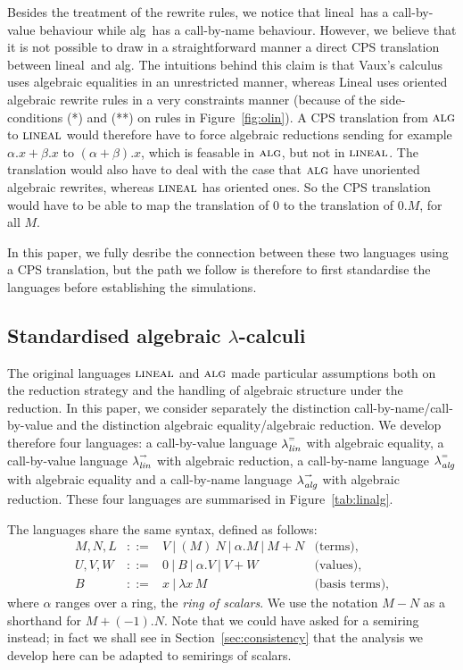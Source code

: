 \documentclass{LMCS}
\newcommand{\define}[1]{{\em #1}}
\newcommand{\olin}{\mbox{\sc lineal}}
\newcommand{\oalg}{\mbox{\sc alg}}
\newcommand{\xllin}[1]{\ensuremath{\lambda^{\raisebox{0.5ex}{\textrm{\tiny $#1$}}}_{{\it lin}}}}
\newcommand{\xlalg}[1]{\ensuremath{\lambda^{\raisebox{0.5ex}{\textrm{\tiny $#1$}}}_{{\it alg}}}}
\newcommand{\llinred}{\xllin{\rightarrow}}
\newcommand{\lalgred}{\xlalg{\rightarrow}}
\newcommand{\llineq}{\xllin{=}}
\newcommand{\lalgeq}{\xlalg{=}}
\begin{document}
Besides the treatment of the rewrite rules, we notice
that \olin\ has a call-by-value behaviour while \oalg\ has a
call-by-name behaviour. However, we believe that it is not possible to
draw in a straightforward manner a direct CPS translation between
\olin\ and \oalg. The intuitions behind this claim is that Vaux's
calculus uses algebraic equalities in an unrestricted manner, whereas
Lineal uses oriented algebraic rewrite rules in a very constraints
manner (because of the side-conditions (*) and (**) on rules in
Figure~\ref{fig:olin}). A CPS translation from $\oalg$ to $\olin$
would therefore have to force algebraic reductions sending for example
$\alpha.x+\beta.x$ to $(\alpha+\beta).x$, which is feasable in
$\oalg$, but not in $\olin$. The translation would also have to deal
with the case that $\oalg$ have unoriented algebraic rewrites, whereas
$\olin$ has oriented ones. So the CPS translation would have to be
able to map the translation of $0$ to the translation of $0.M$, for
all $M$.
 
In this paper, we fully desribe the connection between these two
languages using a CPS translation, but the path we follow is therefore
to first standardise the languages before establishing the
simulations.

\subsection{Standardised algebraic $\lambda$-calculi}\label{sec:alglam}

The original languages $\olin$ and $\oalg$ made particular assumptions
both on the reduction strategy and the handling of algebraic structure
under the reduction.
In this paper, we consider separately the distinction
call-by-name/call-by-value and the distinction algebraic
equality/algebraic reduction. We
develop therefore four languages: a call-by-value language $\llineq$
with algebraic equality, a call-by-value language $\llinred$ with
algebraic reduction, a call-by-name language $\lalgeq$ with algebraic
equality and a call-by-name language $\lalgred$ with algebraic
reduction. 
These four languages are summarised in Figure~\ref{tab:linalg}.

The languages share the same syntax, defined as follows:
\[\begin{array}{rcll}
    M,N,L&::=& V ~|~ (M)~N ~|~ \alpha.M ~|~M+N&\textrm{(terms),}\\
    U,V,W&::=& 0~|~B~|~\alpha.V~|~V+W&\textrm{(values),}\\
    B&::=& x~|~ \lambda x\,M&\textrm{(basis terms),}
\end{array}\]
where $\alpha$ ranges over a ring, the \define{ring of scalars}.
We use the notation $M-N$ as a shorthand for
$M+(-1).N$.
Note that we could have asked for a semiring instead; in
fact we shall see in Section~\ref{sec:consistency} that the analysis we
develop here can be adapted to semirings of scalars.
\end{document}
